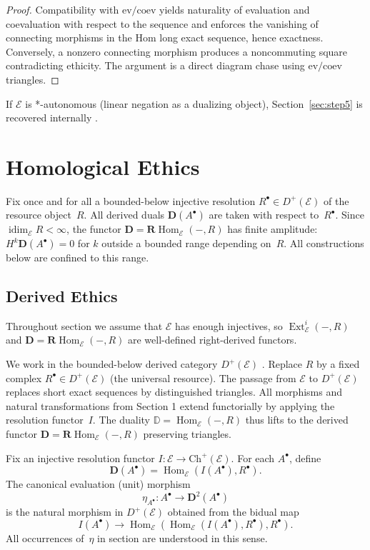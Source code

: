 \documentclass[12pt]{article}
\newcommand{\HD}[2]{H^{#1}\mathbf D(#2)} %
\newcommand{\E}{\mathcal{E}}
\newcommand{\DD}{\mathbb{D}}
\newcommand{\Hom}{\operatorname{Hom}}
\newcommand{\Ext}{\operatorname{Ext}}
\newcommand{\RHom}{\mathbf{R}\!\operatorname{Hom}}
\newcommand{\Dplus}{D^{+}}
\newcommand{\coev}{\mathrm{coev}}
\newcommand{\ev}{\mathrm{ev}}
\theoremstyle{plain}
\theoremstyle{definition}
\theoremstyle{remark}
\numberwithin{equation}{section}
\begin{document}
\begin{proof}
Compatibility with \(\ev/\coev\) yields naturality of evaluation and coevaluation with respect to the sequence and enforces the vanishing of connecting morphisms in the Hom long exact sequence, hence exactness. Conversely, a nonzero connecting morphism produces a noncommuting square contradicting ethicity. The argument is a direct diagram chase using \(\ev/\coev\) triangles.
\end{proof}

If \(\E\) is *-autonomous (linear negation as a dualizing object), Section~\ref{sec:step5} is recovered internally \cite{Barr1979}.

\section{Homological Ethics}

Fix once and for all a bounded-below injective resolution
$R^\bullet\in D^+(\E)$ of the resource object~$R$.
All derived duals $\mathbf D(A^\bullet)$ are taken with respect to~$R^\bullet$. Since $\operatorname{idim}_\E R<\infty$, the functor
$\mathbf D=\RHom_\E(-,R)$ has finite amplitude:
$\HD{k}{A^\bullet}=0$ for $k$ outside a bounded range depending on~$R$.
All constructions below are confined to this range.

\subsection{Derived Ethics}\label{sec:step9}

Throughout section we assume that $\E$ has enough injectives, so $\Ext^i_\E(-,R)$ and $\mathbf D=\RHom_\E(-,R)$ are well-defined right-derived functors. 

We work in the bounded-below derived category \(\Dplus(\E)\) \cite{Verdier1967,Neeman2001}. Replace \(R\) by a fixed complex \(R^\bullet\in \Dplus(\E)\) (the universal resource). The passage from $\E$ to $D^+(\E)$ replaces short exact sequences
by distinguished triangles.
All morphisms and natural transformations from Section 1
extend functorially by applying the resolution functor~$I$.
The duality $\DD=\Hom_\E(-,R)$ thus lifts to the derived functor
$\mathbf D=\RHom_\E(-,R)$ preserving triangles.

Fix an injective resolution functor $I:\E\to\mathrm{Ch}^+(\E)$.
For each $A^\bullet$, define
\[
\mathbf D(A^\bullet)=\Hom_\E(I(A^\bullet),R^\bullet).
\]
The canonical evaluation (unit) morphism
\[
\eta_{A^\bullet}:A^\bullet\longrightarrow \mathbf D^2(A^\bullet)
\]
is the natural morphism in $D^+(\E)$ obtained from the bidual map 
\[
I(A^\bullet)\to\Hom_\E(\Hom_\E(I(A^\bullet),R^\bullet),R^\bullet).
\]
All occurrences of~$\eta$ in section are understood in this sense.
\end{document}
